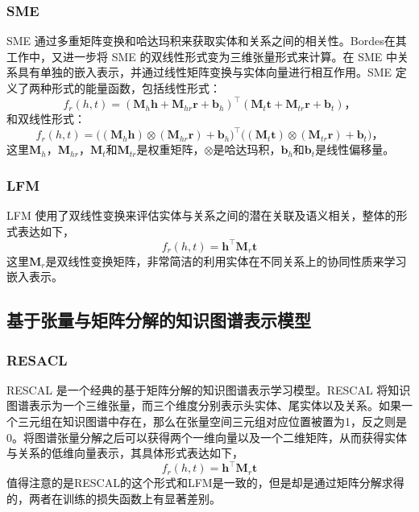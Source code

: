       \subsubsection{SME} 
      SME \cite{bordes2012joint,bordes2014semantic} 通过多重矩阵变换和哈达玛积来获取实体和关系之间的相关性。Bordes\cite{bordes2014semantic}在其工作中，又进一步将 SME 的双线性形式变为三维张量形式来计算。在 SME 中关系具有单独的嵌入表示，并通过线性矩阵变换与实体向量进行相互作用。SME 定义了两种形式的能量函数，包括线性形式：
      \begin{equation}
      f_r(h, t) = (\mathbf{M}_{h} \mathbf{h} + \mathbf{M}_{hr} \mathbf{r} + \mathbf{b}_h )^{\top} (\mathbf{M}_{t} \mathbf{t} + \mathbf{M}_{tr} \mathbf{r} + \mathbf{b}_t)，
      \end{equation}
      和双线性形式：
      \begin{equation}
      f_r(h, t) = \big( (\mathbf{M}_{h} \mathbf{h}) \otimes (\mathbf{M}_{hr} \mathbf{r}) + \mathbf{b}_h \big)^{\top} \big( (\mathbf{M}_{t} \mathbf{t}) \otimes (\mathbf{M}_{tr} \mathbf{r}) + \mathbf{b}_t \big)，
      \end{equation}
      这里$\mathbf{M}_{h}$，$\mathbf{M}_{hr}$，$\mathbf{M}_{t}$和$\mathbf{M}_{tr}$是权重矩阵，$\otimes$是哈达玛积，$\mathbf{b}_h$和$\mathbf{b}_t$是线性偏移量。

      \subsubsection{LFM} 
      LFM \cite{jenatton2012latent,sutskever2009modelling} 使用了双线性变换来评估实体与关系之间的潜在关联及语义相关，整体的形式表达如下，
      \begin{equation}
      f_r(h, t) = \mathbf{h}^{\top}\mathbf{M}_r\mathbf{t}
      \end{equation}
      这里$\mathbf{M}_r$是双线性变换矩阵，非常简洁的利用实体在不同关系上的协同性质来学习嵌入表示。

    \subsection{基于张量与矩阵分解的知识图谱表示模型}

      \subsubsection{RESACL}
      RESCAL \cite{nickel2011three,nickel2012factorizing} 是一个经典的基于矩阵分解的知识图谱表示学习模型。RESCAL 将知识图谱表示为一个三维张量，而三个维度分别表示头实体、尾实体以及关系。如果一个三元组在知识图谱中存在，那么在张量空间三元组对应位置被置为1，反之则是0。将图谱张量分解之后可以获得两个一维向量以及一个二维矩阵，从而获得实体与关系的低维向量表示，其具体形式表达如下，
      \begin{equation}
      f_r(h, t) = \mathbf{h}^{\top}\mathbf{M}_r\mathbf{t}
      \end{equation}
      值得注意的是RESCAL的这个形式和LFM是一致的，但是却是通过矩阵分解求得的，两者在训练的损失函数上有显著差别。

